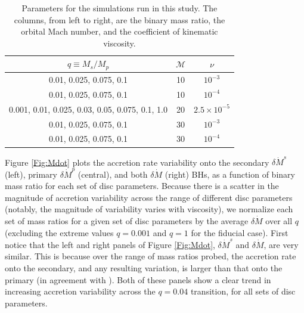   
  

\begin{table}
\begin{center}
\begin{tabular}{ c | c | c }
        $ q\equiv M_s/M_p   $                       & $\mathcal{M}$    & $\nu$ 		  \\
                   \hline 
0.01, 0.025, 0.075, 0.1                                      & 10      & $10^{-3}$      \\
 0.01, 0.025, 0.075, 0.1                                     & 10      & $10^{-4}$    \\
0.001, 0.01, 0.025, 0.03, 0.05, 0.075, 0.1, 1.0                 & 20      & $2.5 \times 10^{-5}$    \\
0.01, 0.025, 0.075, 0.1                                      &  30      & $10^{-3}$   \\
0.01, 0.025, 0.075, 0.1                                      &  30      & $10^{-4}$    
 \end{tabular}
\caption{Parameters for the simulations run in this study. The
  columns, from left to right, are the binary mass ratio, the orbital
  Mach number, and the coefficient of kinematic viscosity.}
\label{Table:sims}
\end{center}
\end{table}




Figure \ref{Fig:Mdot} plots the accretion rate variability onto the
secondary $\delta \dot{M}^s$ (left), primary $\delta \dot{M}^p$
(central), and both $\delta \dot{M}$ (right) BHs, as a function of
binary mass ratio for each set of disc parameters. Because there is a
scatter in the magnitude of accretion variability across the range of
different disc parameters (notably, the magnitude of variability
varies with viscosity), we normalize each set of mass ratios for a
given set of disc parameters by the average $\delta \dot{M}$ over all
$q$ (excluding the extreme values $q=0.001$ and $q=1$ for the fiducial
case). First notice that the left and right panels of Figure
\ref{Fig:Mdot}, $\delta \dot{M}^s$ and $\delta \dot{M}$, are very
similar. This is because over the range of mass ratios probed, the
accretion rate onto the secondary, and any resulting variation, is
larger than that onto the primary (in agreement with
\citealt{Farris:2014}). Both of these panels show a clear trend in
increasing accretion variability across the $q=0.04$ transition, for
all sets of disc parameters.


